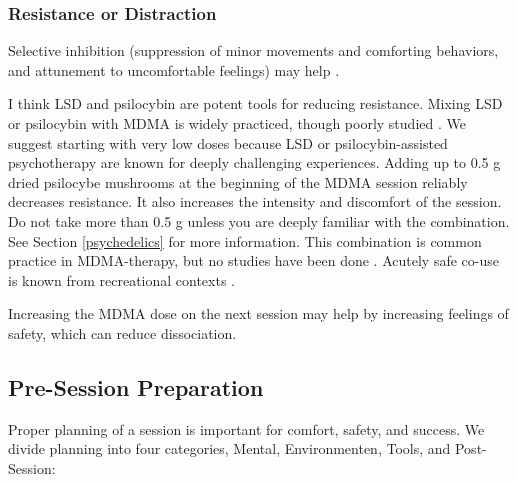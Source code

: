 \documentclass[12pt,letterpaper]{article}
\begin{document}
\subsubsection{Resistance or Distraction}
\label{selectiveInhibition}
Selective inhibition (suppression of minor movements and comforting behaviors, and attunement to uncomfortable feelings) may help \cite{razviPSIP}.

 

I think LSD and psilocybin are potent tools for reducing resistance.  Mixing LSD or psilocybin with MDMA is widely practiced, though poorly studied \cite{zeifmanCo-use}. We suggest starting with very low doses because LSD or psilocybin-assisted psychotherapy are known for deeply challenging experiences. Adding up to 0.5 g dried psilocybe mushrooms at the beginning of the MDMA session reliably decreases resistance. It also increases the intensity and discomfort of the session. Do not take more than 0.5 g unless you are deeply familiar with the combination. See Section \ref{psychedelics} for more information. This combination is common practice in MDMA-therapy, but no studies have been done \cite{colemanPsychedelicPsychotherapy}. Acutely safe co-use is known from recreational contexts \cite{zeifmanCo-use}. 

Increasing the MDMA dose on the next session may help by increasing feelings of safety, which can reduce dissociation.
\subsection{Pre-Session Preparation}
\label{prep}
Proper planning of a session is important for comfort, safety, and success. We divide planning into four categories, Mental, Environmenten, Tools, and Post-Session:

\vspace{\baselineskip}
\end{document}
